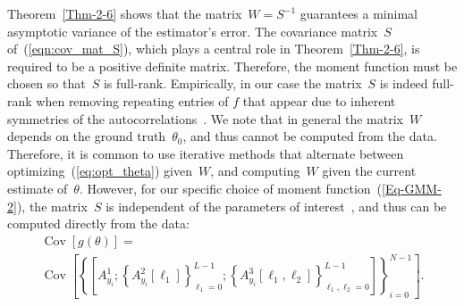 \documentclass{article}
\newcommand{\Cov}[0]{\operatorname{Cov}}
\begin{document}
Theorem~\ref{Thm-2-6} {shows that the matrix~$W = S^{-1}$ guarantees} a minimal asymptotic variance of the estimator’s error. The covariance matrix~$S$ {of~(\ref{eqn:cov_mat_S}), which plays a central role in Theorem~\ref{Thm-2-6},} is required to be a positive definite matrix. Therefore, the moment function must be chosen so that~$S$ is full-rank. Empirically, in our case the matrix~$S$ is indeed full-rank when removing repeating entries of $f$ that appear due to  inherent symmetries of the autocorrelations~\cite{abas2021generalized}. We note that in general the matrix~$W$ depends on the ground truth~$\theta_0$, and thus cannot be computed from the data. {Therefore, it is common to use iterative methods that alternate between optimizing~(\ref{eq:opt_theta}) given~$W$, and computing~$W$ given the current estimate of~$\theta$}. However, for our specific choice of moment function~(\ref{Eq-GMM-2}), the matrix~$S$ is independent of the parameters of interest~\cite{abas2021generalized}, and thus can be computed directly from the data: %
\begin{multline}\label{Eq-2-7}
	\Cov[g(\theta)] = \\ \Cov\left[\left\{[A_{y_i}^1;\left\{A_{y_i}^2[\ell_1]\right\}_{\ell_1=0}^{L-1};\left\{A_{y_i}^3[\ell_1, \ell_2]\right\}_{\ell_1, \ell_2 = 0}^{L-1}]\right\}_{i = 0}^{N - 1}\right].
\end{multline}
\end{document}
